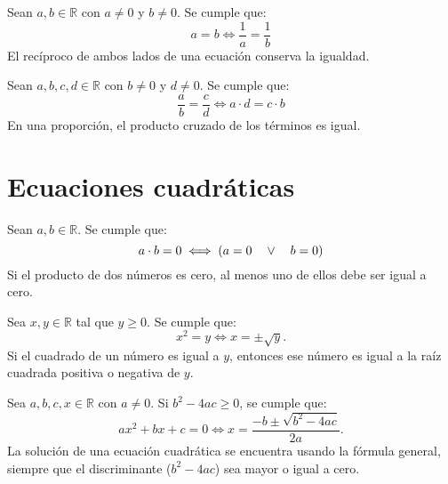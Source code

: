 \documentclass[a4,11pt]{aleph-notas}
\begin{document}
\begin{teo}
    Sean \(a, b \in \mathbb{R}\) con \(a \neq 0\) y \(b \neq 0\). Se cumple que:  
    \[
    a = b \iff \dfrac{1}{a} = \dfrac{1}{b}
    \]  
    El recíproco de ambos lados de una ecuación conserva la igualdad.
\end{teo}

\begin{teo}
    Sean \(a, b, c, d \in \mathbb{R}\) con \(b \neq 0\) y \(d \neq 0\). Se cumple que:  
    \[
    \dfrac{a}{b} = \dfrac{c}{d} \iff a \cdot d = c \cdot b
    \]  
    En una proporción, el producto cruzado de los términos es igual.
\end{teo}

\section{Ecuaciones cuadráticas}

\begin{teo}
    Sean \(a, b \in \mathbb{R}\). Se cumple que:  
    \[
    a \cdot b = 0 \iff (a = 0 \quad \lor \quad b = 0)
    \]  
    Si el producto de dos números es cero, al menos uno de ellos debe ser igual a cero.
\end{teo}

\begin{teo}
    Sea \(x, y \in \mathbb{R}\) tal que \(y \geq 0\). Se cumple que:  
    \[
        x^2 = y \iff x = \pm\sqrt{y}.
    \]  
    Si el cuadrado de un número es igual a \(y\), entonces ese número es igual a la raíz cuadrada positiva o negativa de \(y\).
\end{teo}

\begin{teo}
    Sea \(a, b, c, x \in \mathbb{R}\) con \(a \neq 0\). Si \(b^2 - 4ac \geq 0\), se cumple que:  
    \[
        ax^2 + bx + c = 0 \iff x = \frac{-b \pm \sqrt{b^2 - 4ac}}{2a}.
    \]  
    La solución de una ecuación cuadrática se encuentra usando la fórmula general, siempre que el discriminante (\(b^2 - 4ac\)) sea mayor o igual a cero.
\end{teo}
\end{document}
